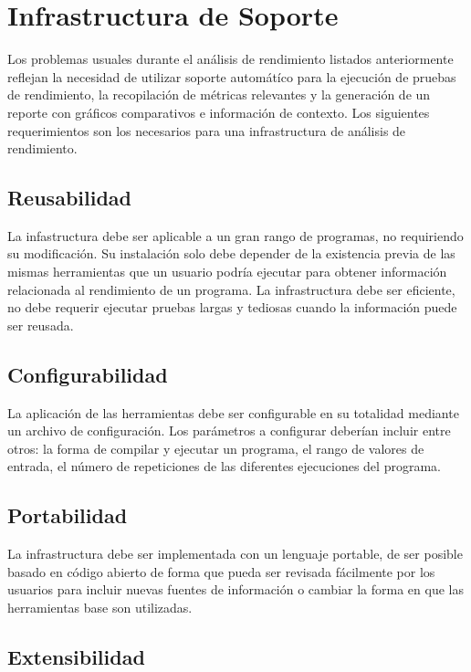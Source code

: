 \documentclass[a4paper]{report}
\begin{document}
\section{Infrastructura de Soporte}

Los problemas usuales durante el análisis de rendimiento listados anteriormente reflejan la necesidad de utilizar soporte automátíco para la ejecución de pruebas de rendimiento, la recopilación de métricas relevantes y la generación de un reporte con gráficos comparativos e información de contexto. Los siguientes requerimientos son los necesarios para una infrastructura de análisis de rendimiento.

\subsection{Reusabilidad}

La infastructura debe ser aplicable a un gran rango de programas, no requiriendo su modificación.
Su instalación solo debe depender de la existencia previa de las mismas herramientas que un usuario podría ejecutar para obtener información relacionada al rendimiento de un programa. La infrastructura debe ser eficiente, no debe requerir ejecutar pruebas largas y tediosas cuando la información puede ser reusada.

\subsection{Configurabilidad}

La aplicación de las herramientas debe ser configurable en su totalidad mediante un archivo de configuración.
Los parámetros a configurar deberían incluir entre otros: la forma de compilar y ejecutar un programa, el rango de valores de entrada, el número de repeticiones de las diferentes ejecuciones del programa.

\subsection{Portabilidad}

La infrastructura debe ser implementada con un lenguaje portable, de ser posible basado en código abierto de forma que pueda ser revisada fácilmente por los usuarios para incluir nuevas fuentes de información o cambiar la forma en que las herramientas base son utilizadas.

\subsection{Extensibilidad}
\end{document}
